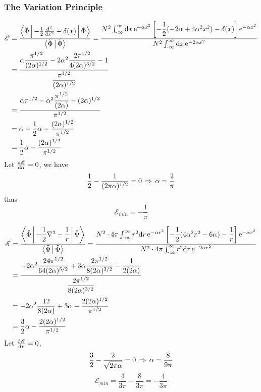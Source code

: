 \documentclass[a4paper]{article}
\begin{document}
\subsubsection{The Variation Principle}
\begin{equation}\label{key}
\begin{aligned}
\mathscr{E} &= \dfrac{\Braket{\tilde{\Phi} | -\tfrac{1}{2}\dv[2]{x}-\delta(x) | \tilde{\Phi}}}{\Braket{\tilde{\Phi} | \tilde{\Phi}}} = \dfrac{N^2 \operatorname{\int_{-\infty}^\infty}\dd x \operatorname{\mathrm{e}}^{-\alpha x^2}\qty[-\dfrac{1}{2}(-2\alpha+4\alpha^2 x^2) - \delta(x)]\operatorname{\mathrm{e}}^{-\alpha x^2}}{N^2\operatorname{\int_{-\infty}^\infty}\dd x \operatorname{\mathrm{e}}^{-2\alpha x^2}}\\
&= \dfrac{\alpha\dfrac{\pi^{1/2}}{(2\alpha)^{1/2}} - 2\alpha^2\dfrac{2\pi^{1/2}}{4(2\alpha)^{3/2}} - 1}{\dfrac{\pi^{1/2}}{(2\alpha)^{1/2}}}\\
&= \dfrac{\alpha \pi^{1/2} - \alpha^2\dfrac{\pi^{1/2}}{(2\alpha)} - (2\alpha)^{1/2}}{\pi^{1/2}}\\
&= \alpha - \dfrac{1}{2}\alpha - \dfrac{(2\alpha)^{1/2}}{\pi^{1/2}}\\
&= \dfrac{1}{2}\alpha - \dfrac{(2\alpha)^{1/2}}{\pi^{1/2}}
\end{aligned}
\end{equation}
Let $ \dv{\mathscr{E}}{\alpha} = 0 $, we have
\begin{equation}\label{key}
\dfrac{1}{2} - \dfrac{1}{(2\pi\alpha)^{1/2}} = 0 \;\operatorname{\Rightarrow}\; \alpha = \dfrac{2}{\pi}
\end{equation}
thus
\begin{equation}\label{key}
\mathscr{E}_{min} = -\dfrac{1}{\pi}
\end{equation}

\begin{equation}\label{key}
\begin{aligned}
\mathscr{E} &= \dfrac{\Braket{\tilde{\Phi} | -\dfrac{1}{2}\nabla^2 - \dfrac{1}{r} | \tilde{\Phi}}}{\Braket{\tilde{\Phi} | \tilde{\Phi}}} = \dfrac{N^2 \cdot 4\pi \operatorname{\int_{-\infty}^\infty} r^2\dd r \operatorname{\mathrm{e}}^{-\alpha r^2}\qty[-\dfrac{1}{2}(4 \alpha^2 r^2 - 6\alpha ) - \dfrac{1}{r}]\operatorname{\mathrm{e}}^{-\alpha r^2}}{N^2\cdot 4\pi \operatorname{\int_{-\infty}^\infty} r^2\dd r \operatorname{\mathrm{e}}^{-2\alpha r^2}}\\
&= \dfrac{-2\alpha^2\dfrac{24\pi^{1/2}}{64(2\alpha)^{5/2}} + 3\alpha\dfrac{2\pi^{1/2}}{8(2\alpha)^{3/2}} - \dfrac{1}{2(2\alpha)} }{\dfrac{2\pi^{1/2}}{8(2\alpha)^{3/2}}}\\
&= -2\alpha^2\dfrac{12}{8(2\alpha)} + 3\alpha - \dfrac{2(2\alpha)^{1/2}}{\pi^{1/2} } \\
&= \dfrac{3}{2}\alpha - \dfrac{2(2\alpha)^{1/2}}{\pi^{1/2} }
\end{aligned}
\end{equation}
Let $ \dv{\mathscr{E}}{r} = 0 $,
\begin{equation}\label{key}
\dfrac{3}{2} - \dfrac{2}{\sqrt{2\pi\alpha}} = 0 \;\operatorname{\Rightarrow}\; \alpha = \dfrac{8}{9\pi}
\end{equation}
\begin{equation}\label{key}
\mathscr{E}_{min} = \dfrac{4}{3\pi} - \dfrac{8}{3\pi} = -\dfrac{4}{3\pi}
\end{equation}
\end{document}
